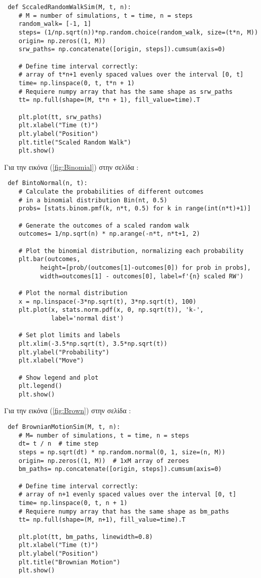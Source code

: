 \documentclass[12pt,a4paper,twoside,openany]{book}
\begin{document}
\begin{lstlisting}
 def SccaledRandomWalkSim(M, t, n): 
 	# M = number of simulations, t = time, n = steps
 	random_walk= [-1, 1]
 	steps= (1/np.sqrt(n))*np.random.choice(random_walk, size=(t*n, M))
 	origin= np.zeros((1, M))
 	srw_paths= np.concatenate([origin, steps]).cumsum(axis=0)
 		
 	# Define time interval correctly:
 	# array of t*n+1 evenly spaced values over the interval [0, t]
 	time= np.linspace(0, t, t*n + 1)  
 	# Requiere numpy array that has the same shape as srw_paths
 	tt= np.full(shape=(M, t*n + 1), fill_value=time).T
 		
 	plt.plot(tt, srw_paths)
 	plt.xlabel("Time (t)")
 	plt.ylabel("Position")
 	plt.title("Scaled Random Walk")
 	plt.show() \end{lstlisting}
 	\vspace{4mm}
 	Για την εικόνα (\ref{fig:Binomial}) στην σελίδα \pageref{fig:Binomial}:
 	\vspace{4mm}
\begin{lstlisting}
 def BintoNormal(n, t):
 	# Calculate the probabilities of different outcomes 
 	# in a binomial distribution Bin(nt, 0.5)
 	probs= [stats.binom.pmf(k, n*t, 0.5) for k in range(int(n*t)+1)]
 		
 	# Generate the outcomes of a scaled random walk
 	outcomes= 1/np.sqrt(n) * np.arange(-n*t, n*t+1, 2) 
 		
 	# Plot the binomial distribution, normalizing each probability
 	plt.bar(outcomes, 
 	      height=[prob/(outcomes[1]-outcomes[0]) for prob in probs], 
 		  width=outcomes[1] - outcomes[0], label=f'{n} scaled RW')
 		
 	# Plot the normal distribution
 	x = np.linspace(-3*np.sqrt(t), 3*np.sqrt(t), 100)  
 	plt.plot(x, stats.norm.pdf(x, 0, np.sqrt(t)), 'k-', 
 			 label='normal dist')    
 		
 	# Set plot limits and labels
 	plt.xlim(-3.5*np.sqrt(t), 3.5*np.sqrt(t))
 	plt.ylabel("Probability")
 	plt.xlabel("Move")
 		
 	# Show legend and plot
 	plt.legend()
 	plt.show()\end{lstlisting}
 	\vspace{4mm}
 	Για την εικόνα (\ref{fig:Brown}) στην σελίδα \pageref{fig:Brown}:
 	\vspace{4mm}
\begin{lstlisting}
 def BrownianMotionSim(M, t, n):  
 	# M= number of simulations, t = time, n = steps
 	dt= t / n  # time step
 	steps = np.sqrt(dt) * np.random.normal(0, 1, size=(n, M))
 	origin= np.zeros((1, M))  # 1xM array of zeroes
 	bm_paths= np.concatenate([origin, steps]).cumsum(axis=0)
 		
 	# Define time interval correctly:
 	# array of n+1 evenly spaced values over the interval [0, t]
 	time= np.linspace(0, t, n + 1)  
 	# Requiere numpy array that has the same shape as bm_paths
 	tt= np.full(shape=(M, n+1), fill_value=time).T
 		
 	plt.plot(tt, bm_paths, linewidth=0.8)
 	plt.xlabel("Time (t)")
 	plt.ylabel("Position")
 	plt.title("Brownian Motion")
 	plt.show() \end{lstlisting}
\end{document}
